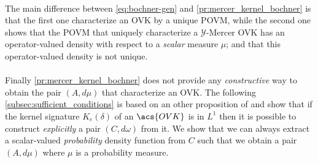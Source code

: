\paragraph{}
The main difference between \cref{eq:bochner-gen} and \cref{pr:mercer_kernel_bochner} is that the first one characterize an \acs{OVK} by a unique \acf{POVM}, while the second one shows that the \acs{POVM} that uniquely characterize a $\mathcal{Y}$-Mercer \acs{OVK} has an operator-valued density with respect to a \emph{scalar} measure $\mu$; and that this operator-valued density is not unique.
\paragraph{}
Finally \cref{pr:mercer_kernel_bochner} does not provide any \emph{constructive} way to obtain the pair $(A,d\mu)$ that characterize an \acs{OVK}.
The following \cref{subsec:sufficient_conditions} is based on an other proposition of \citeauthor{carmeli2006vector} and show that if the kernel signature $K_e(\delta)$ of an $\acs{OVK}$ is in $L^1$ then it is possible to construct \emph{explicitly} a pair $(C,d\omega)$ from it. We show that we can always extract a scalar-valued \emph{probability} density function from $C$ such that we obtain a pair $(A,d\mu)$ where $\mu$ is a probability measure.

